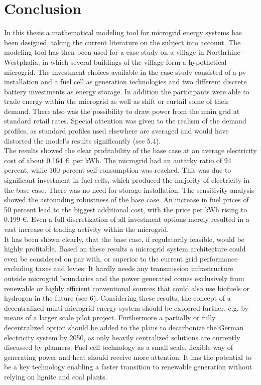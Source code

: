 \documentclass[
	11pt,								%
	DIV10,								%
	a4paper,         					%
	oneside,							%
	headheight=20pt,					%
	footheight=20pt,					%
    parskip=full,						%
    listof=totoc,						%
	bibliography=totoc,					%
	index=totoc,						%
]{scrartcl}
\begin{document}
\section{Conclusion}
In this thesis a mathematical modeling tool for microgrid energy systems has been designed, taking the current literature on the subject into account. The modeling tool has then been used for a case study on a village in Northrhine-Westphalia, in which several buildings of the village form a hypothetical microgrid. The investment choices available in the case study consisted of a pv installation and a fuel cell as generation technologies and two different discrete battery investments as energy storage. In addition the participants were able to trade energy within the microgrid as well as shift or curtail some of their demand. There also was the possibility to draw power from the main grid at standard retail rates. Special attention was given to the realism of the demand profiles, as standard profiles used elsewhere are averaged and would have distorted the model's results significantly (see 5.4). \\
The results showed the clear profitability of the base case at an average electricity cost of about 0.164 \euro\ per kWh. The microgrid had an autarky ratio of 94 percent, while 100 percent self-consumption was reached. This was due to significant investment in fuel cells, which produced the majority of electricity in the base case. There was no need for storage installation. The sensitivity analysis showed the astounding robustness of the base case. An increase in fuel prices of 50 percent lead to the biggest additional cost, with the price per kWh rising to 0.199 \euro. Even a full discretization of all investment options merely resulted in a vast increase of trading activity within the microgrid.\\
It has been shown clearly, that the base case, if regulatorily feasible, would be highly profitable. Based on these results a microgrid system architecture could even be considered on par with, or superior to the current grid performance excluding taxes and levies: It hardly needs any transmission infrastructure outside microgrid boundaries and the power generated comes exclusively from renewable or highly efficient conventional sources that could also use biofuels or hydrogen in the future (see 6). 
Considering these results, the concept of a decentralized multi-microgrid energy system should be explored further, e.g. by means of a larger scale pilot project. Furthermore a partially or fully decentralized option should be added to the plans to decarbonize the German electricity system by 2050, as only heavily centralized solutions are currently discussed by planners. Fuel cell technology as a small scale, flexible way of generating power and heat should receive more attention. It has the potential to be a key technology enabling a faster transition to renewable generation without relying on lignite and coal plants.
\end{document}
